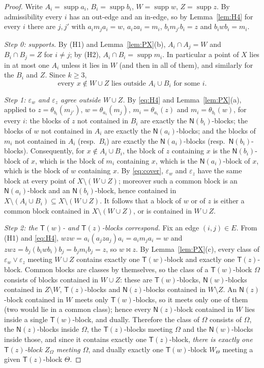 \documentclass[11pt]{amsart}
\theoremstyle{definition}
\newcommand{\supp}{\operatorname{supp}}
\newcommand{\T}{\mathsf{T}}
\newcommand{\N}{\mathsf{N}}
\newcommand{\mt}{\bowtie}      %
\begin{document}
\begin{proof}
Write $A_i=\supp a_i$, $B_i=\supp b_i$, $W=\supp w$, $Z=\supp z$. By admissibility every $i$ has an out-edge and an in-edge, so by Lemma~\ref{lem:H4} for every $i$ there are $j,j'$ with $a_im_ja_i=w$, $a_iza_i=m_i$, $b_im_{j'}b_i=z$ and $b_iwb_i=m_i$.

\emph{Step 0: supports.} By (H1) and Lemma~\ref{lem:PX}(b), $A_i\cap A_j=W$ and $B_i\cap B_j=Z$ for $i\ne j$; by (H2), $A_i\cap B_i=\supp m_i$. In particular a point of $X$ lies in at most one $A_i$ unless it lies in $W$ (and then in all of them), and similarly for the $B_i$ and $Z$. Since $k\ge3$,
\begin{equation}\label{eq:cover}
\text{every } x\notin W\cup Z \text{ lies outside } A_i\cup B_i \text{ for some } i .
\end{equation}

\emph{Step 1: $\varepsilon_w$ and $\varepsilon_z$ agree outside $W\cup Z$.} By \eqref{eq:H4} and Lemma~\ref{lem:PX}(a), applied to $z=\theta_{b_i}(m_{j'})$, $w=\theta_{a_i}(m_j)$, $m_i=\theta_{a_i}(z)$ and $m_i=\theta_{b_i}(w)$, for every $i$: the blocks of $z$ not contained in $B_i$ are exactly the $\N(b_i)$-blocks; the blocks of $w$ not contained in $A_i$ are exactly the $\N(a_i)$-blocks; and the blocks of $m_i$ not contained in $A_i$ (resp.\ $B_i$) are exactly the $\N(a_i)$-blocks (resp.\ $\N(b_i)$-blocks). Consequently, for $x\notin A_i\cup B_i$, the block of $z$ containing $x$ is the $\N(b_i)$-block of $x$, which is the block of $m_i$ containing $x$, which is the $\N(a_i)$-block of $x$, which is the block of $w$ containing $x$. By \eqref{eq:cover}, $\varepsilon_w$ and $\varepsilon_z$ have the same block at every point of $X\setminus(W\cup Z)$; moreover such a common block is an $\N(a_i)$-block and an $\N(b_i)$-block, hence contained in $X\setminus(A_i\cup B_i)\subseteq X\setminus(W\cup Z)$. It follows that a block of $w$ or of $z$ is either a common block contained in $X\setminus(W\cup Z)$, or is contained in $W\cup Z$.

\emph{Step 2: the $\T(w)$- and $\T(z)$-blocks correspond.} Fix an edge $(i,j)\in E$. From (H1) and \eqref{eq:H4}, $wzw=a_i(a_jza_j)a_i=a_im_ja_i=w$ and $zwz=b_j(b_iwb_i)b_j=b_jm_ib_j=z$, so $w\mt z$. By Lemma~\ref{lem:PX}(c), every class of $\varepsilon_w\vee\varepsilon_z$ meeting $W\cup Z$ contains exactly one $\T(w)$-block and exactly one $\T(z)$-block. Common blocks are classes by themselves, so the class of a $\T(w)$-block $\Omega$ consists of blocks contained in $W\cup Z$: these are $\T(w)$-blocks, $\N(w)$-blocks contained in $Z\setminus W$, $\T(z)$-blocks and $\N(z)$-blocks contained in $W\setminus Z$. An $\N(z)$-block contained in $W$ meets only $\T(w)$-blocks, so it meets only one of them (two would lie in a common class); hence every $\N(z)$-block contained in $W$ lies inside a single $\T(w)$-block, and dually. Therefore the class of $\Omega$ consists of $\Omega$, the $\N(z)$-blocks inside $\Omega$, the $\T(z)$-blocks meeting $\Omega$ and the $\N(w)$-blocks inside those, and since it contains exactly one $\T(z)$-block, \emph{there is exactly one $\T(z)$-block $Z_\Omega$ meeting $\Omega$}, and dually exactly one $\T(w)$-block $W_\Theta$ meeting a given $\T(z)$-block $\Theta$.


\end{proof}
\end{document}
